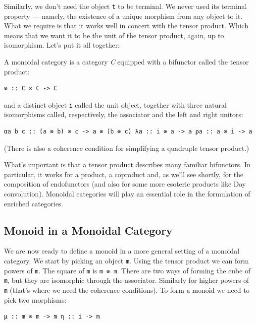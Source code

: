 Similarly, we don't need the object \texttt{t} to be terminal. We never
used its terminal property --- namely, the existence of a unique
morphism from any object to it. What we require is that it works well in
concert with the tensor product. Which means that we want it to be the
unit of the tensor product, again, up to isomorphism. Let's put it all
together:

A monoidal category is a category \emph{C} equipped with a bifunctor
called the tensor product:

\begin{verbatim}
⊗ :: C × C -> C
\end{verbatim}

and a distinct object \texttt{i} called the unit object, together with
three natural isomorphisms called, respectively, the associator and the
left and right unitors:

\begin{verbatim}
αa b c :: (a ⊗ b) ⊗ c -> a ⊗ (b ⊗ c) λa :: i ⊗ a -> a ρa :: a ⊗ i -> a
\end{verbatim}

(There is also a coherence condition for simplifying a quadruple tensor
product.)

What's important is that a tensor product describes many familiar
bifunctors. In particular, it works for a product, a coproduct and, as
we'll see shortly, for the composition of endofunctors (and also for
some more esoteric products like Day convolution). Monoidal categories
will play an essential role in the formulation of enriched categories.

\subsection{Monoid in a Monoidal
Category}\label{monoid-in-a-monoidal-category}

We are now ready to define a monoid in a more general setting of a
monoidal category. We start by picking an object \texttt{m}. Using the
tensor product we can form powers of \texttt{m}. The square of
\texttt{m} is \texttt{m\ ⊗\ m}. There are two ways of forming the cube
of \texttt{m}, but they are isomorphic through the associator. Similarly
for higher powers of \texttt{m} (that's where we need the coherence
conditions). To form a monoid we need to pick two morphisms:

\begin{verbatim}
μ :: m ⊗ m -> m η :: i -> m
\end{verbatim}

